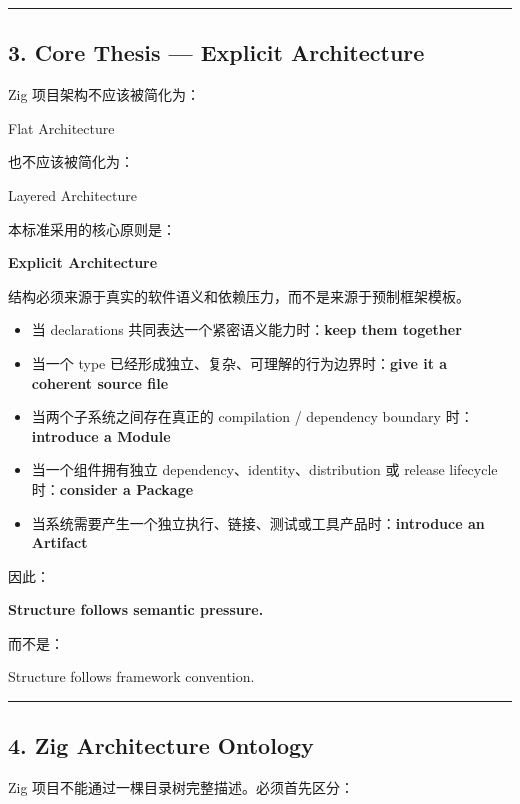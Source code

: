 \documentclass[11pt,a4paper]{article}
\begin{document}
\vspace{0.5em}\hrule\vspace{0.5em}
\subsection{3. Core Thesis — Explicit Architecture}
Zig 项目架构不应该被简化为：

\begin{gfmBlockquote}
Flat Architecture
\end{gfmBlockquote}
也不应该被简化为：

\begin{gfmBlockquote}
Layered Architecture
\end{gfmBlockquote}
本标准采用的核心原则是：

\begin{gfmBlockquote}
\textbf{Explicit Architecture}
\end{gfmBlockquote}
结构必须来源于真实的软件语义和依赖压力，而不是来源于预制框架模板。

\begin{itemize}
  \item 当 declarations 共同表达一个紧密语义能力时：\textbf{keep them together}
  \item 当一个 type 已经形成独立、复杂、可理解的行为边界时：\textbf{give it a coherent source file}
  \item 当两个子系统之间存在真正的 compilation / dependency boundary 时：\textbf{introduce a Module}
  \item 当一个组件拥有独立 dependency、identity、distribution 或 release lifecycle 时：\textbf{consider a Package}
  \item 当系统需要产生一个独立执行、链接、测试或工具产品时：\textbf{introduce an Artifact}
\end{itemize}
因此：

\begin{gfmBlockquote}
\textbf{Structure follows semantic pressure.}
\end{gfmBlockquote}
而不是：

\begin{gfmBlockquote}
Structure follows framework convention.
\end{gfmBlockquote}
\vspace{0.5em}\hrule\vspace{0.5em}
\subsection{4. Zig Architecture Ontology}
Zig 项目不能通过一棵目录树完整描述。必须首先区分：
\end{document}
